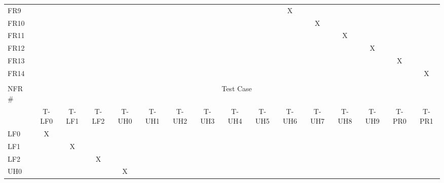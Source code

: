 \documentclass[12pt, titlepage]{article}
\begin{document}
\begin{longtable}{lcccclllllclcccc}
\multicolumn{1}{l|}{FR9} &  &  &  &  & \multicolumn{1}{c}{} & \multicolumn{1}{c}{} & \multicolumn{1}{c}{} & \multicolumn{1}{c}{} & \multicolumn{1}{c}{} & X &  &  &  &  &  \\
\multicolumn{1}{l|}{FR10} & \multicolumn{1}{l}{} & \multicolumn{1}{l}{} & \multicolumn{1}{l}{} & \multicolumn{1}{l}{} &  &  &  &  &  &  & \multicolumn{1}{c}{X} &  &  &  &  \\
\multicolumn{1}{l|}{FR11} & \multicolumn{1}{l}{} & \multicolumn{1}{l}{} & \multicolumn{1}{l}{} & \multicolumn{1}{l}{} &  &  &  &  &  &  &  & X &  &  &  \\
\multicolumn{1}{l|}{FR12} & \multicolumn{1}{l}{} & \multicolumn{1}{l}{} & \multicolumn{1}{l}{} & \multicolumn{1}{l}{} &  &  &  &  &  &  &  &  & X &  &  \\
\multicolumn{1}{l|}{FR13} & \multicolumn{1}{l}{} & \multicolumn{1}{l}{} & \multicolumn{1}{l}{} & \multicolumn{1}{l}{} &  &  &  &  &  &  &  &  &  & X &  \\
\multicolumn{1}{l|}{FR14} & \multicolumn{1}{l}{} & \multicolumn{1}{l}{} & \multicolumn{1}{l}{} & \multicolumn{1}{l}{} &  &  &  &  &  &  &  &  &  &  & X \\
 & \multicolumn{1}{l}{} & \multicolumn{1}{l}{} & \multicolumn{1}{l}{} & \multicolumn{1}{l}{} &  &  &  &  &  & \multicolumn{1}{l}{} &  & \multicolumn{1}{l}{} & \multicolumn{1}{l}{} & \multicolumn{1}{l}{} & \multicolumn{1}{l}{} \\
\multicolumn{1}{l|}{NFR \#} & \multicolumn{15}{c}{Test Case} \\ \hline
\multicolumn{1}{l|}{} & T-LF0 & T-LF1 & T-LF2 & T-UH0 & \multicolumn{1}{c}{T-UH1} & \multicolumn{1}{c}{T-UH2} & \multicolumn{1}{c}{T-UH3} & \multicolumn{1}{c}{T-UH4} & \multicolumn{1}{c}{T-UH5} & T-UH6 & \multicolumn{1}{c}{T-UH7} & T-UH8 & T-UH9 & T-PR0 & T-PR1 \\
\multicolumn{1}{l|}{LF0} & X &  &  &  & \multicolumn{1}{c}{} &  &  &  &  & \multicolumn{1}{l}{} &  & \multicolumn{1}{l}{} & \multicolumn{1}{l}{} & \multicolumn{1}{l}{} & \multicolumn{1}{l}{} \\
\multicolumn{1}{l|}{LF1} &  & X &  &  & \multicolumn{1}{c}{} &  &  &  &  & \multicolumn{1}{l}{} &  & \multicolumn{1}{l}{} & \multicolumn{1}{l}{} & \multicolumn{1}{l}{} & \multicolumn{1}{l}{} \\
\multicolumn{1}{l|}{LF2} &  &  & X &  & \multicolumn{1}{c}{} &  &  &  &  & \multicolumn{1}{l}{} &  & \multicolumn{1}{l}{} & \multicolumn{1}{l}{} & \multicolumn{1}{l}{} & \multicolumn{1}{l}{} \\
\multicolumn{1}{l|}{UH0} &  &  &  & X & \multicolumn{1}{c}{} &  &  &  &  & \multicolumn{1}{l}{} &  & \multicolumn{1}{l}{} & \multicolumn{1}{l}{} & \multicolumn{1}{l}{} & \multicolumn{1}{l}{} \\

\end{longtable}
\end{document}
